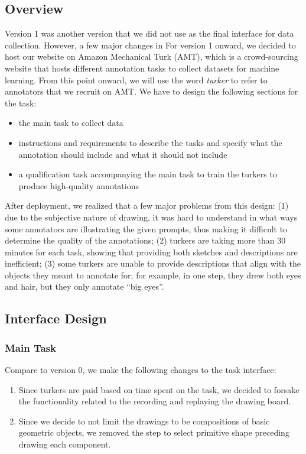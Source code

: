 \subsection{Overview}
Version 1 was another version that we did not use as the final interface for data collection. However, a few major changes in 
For version 1 onward, we decided to host our website on Amazon Mechanical Turk (AMT), which is a crowd-sourcing website that hosts different annotation tasks to collect datasets for machine learning. From this point onward, we will use the word \textit{turker} to refer to annotators that we recruit on AMT. We have to design the following sections for the task: 
\begin{itemize}
    \item the main task to collect data
    \item instructions and requirements to describe the tasks and specify what the annotation should include and what it should not include
    \item a qualification task accompanying the main task to train the turkers to produce high-quality annotations
\end{itemize}
After deployment, we realized that a few major problems from this design: (1) due to the subjective nature of drawing, it was hard to understand in what ways some annotators are illustrating the given prompts, thus making it difficult to determine the quality of the annotations; (2) turkers are taking more than 30 minutes for each task, showing that providing both sketches and descriptions are inefficient; (3) some turkers are unable to provide descriptions that align with the objects they meant to annotate for; for example, in one step, they drew both eyes and hair, but they only annotate ``big eyes''.      

\subsection{Interface Design}

\subsubsection{Main Task}
Compare to version 0, we make the following changes to the task interface: 
\begin{enumerate}
    \item Since turkers are paid based on time spent on the task, we decided to forsake the functionality related to the recording and replaying the drawing board.
    \item Since we decide to not limit the drawings to be compositions of basic geometric objects, we removed the step to select primitive shape preceding drawing each component.
\end{enumerate}

